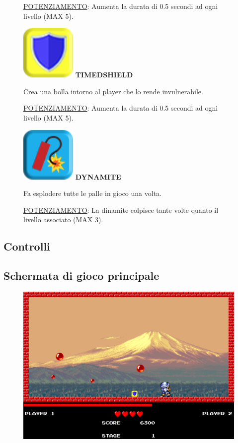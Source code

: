 \documentclass[a4paper,12pt]{report}
\begin{document}
\begin{itemize}
\begin{figure}[H]
 			\underline{POTENZIAMENTO}: Aumenta la durata di 0.5 secondi ad ogni livello (MAX 5).
	\end{figure}
	\begin{figure}[H]
			\item
			\includegraphics[width=0.05\linewidth]{img/5}
			\label{img:shield}
			\textbf{TIMEDSHIELD}

			Crea una bolla intorno al player che lo rende invulnerabile.

 			\underline{POTENZIAMENTO}: Aumenta la durata di 0.5 secondi ad ogni livello (MAX 5).
	\end{figure}
	\begin{figure}[H]
			\item
			\includegraphics[width=0.05\linewidth]{img/6}
			\label{img:dynamite}
			\textbf{DYNAMITE}

			Fa esplodere tutte le palle in gioco una volta.

 			\underline{POTENZIAMENTO}: La dinamite colpisce tante volte quanto il livello associato (MAX 3).
	\end{figure}
\end{itemize}

\subsection*{Controlli}

\subsection*{Schermata di gioco principale}
\begin{figure}[H]
\includegraphics[width=\linewidth]{img/7}
\label{img:decorator}
\end{figure}
\end{document}
